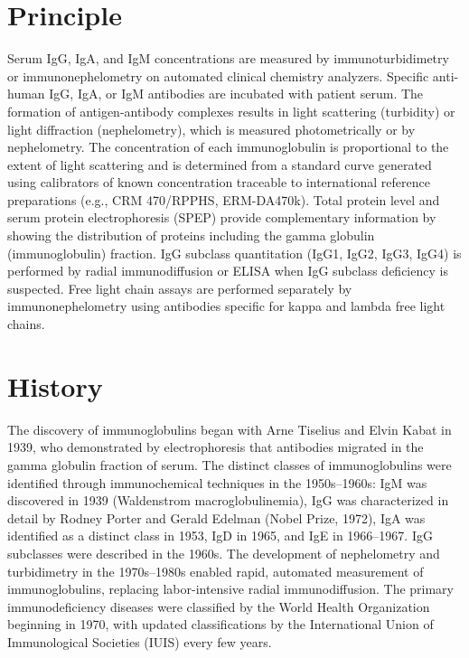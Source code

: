 \section*{Principle}
Serum IgG, IgA, and IgM concentrations are measured by immunoturbidimetry or immunonephelometry on automated clinical chemistry analyzers. Specific anti-human IgG, IgA, or IgM antibodies are incubated with patient serum. The formation of antigen-antibody complexes results in light scattering (turbidity) or light diffraction (nephelometry), which is measured photometrically or by nephelometry. The concentration of each immunoglobulin is proportional to the extent of light scattering and is determined from a standard curve generated using calibrators of known concentration traceable to international reference preparations (e.g., CRM 470/RPPHS, ERM-DA470k). Total protein level and serum protein electrophoresis (SPEP) provide complementary information by showing the distribution of proteins including the gamma globulin (immunoglobulin) fraction. IgG subclass quantitation (IgG1, IgG2, IgG3, IgG4) is performed by radial immunodiffusion or ELISA when IgG subclass deficiency is suspected. Free light chain assays are performed separately by immunonephelometry using antibodies specific for kappa and lambda free light chains.

\section*{History}
The discovery of immunoglobulins began with Arne Tiselius and Elvin Kabat in 1939, who demonstrated by electrophoresis that antibodies migrated in the gamma globulin fraction of serum. The distinct classes of immunoglobulins were identified through immunochemical techniques in the 1950s--1960s: IgM was discovered in 1939 (Waldenstrom macroglobulinemia), IgG was characterized in detail by Rodney Porter and Gerald Edelman (Nobel Prize, 1972), IgA was identified as a distinct class in 1953, IgD in 1965, and IgE in 1966--1967. IgG subclasses were described in the 1960s. The development of nephelometry and turbidimetry in the 1970s--1980s enabled rapid, automated measurement of immunoglobulins, replacing labor-intensive radial immunodiffusion. The primary immunodeficiency diseases were classified by the World Health Organization beginning in 1970, with updated classifications by the International Union of Immunological Societies (IUIS) every few years.

